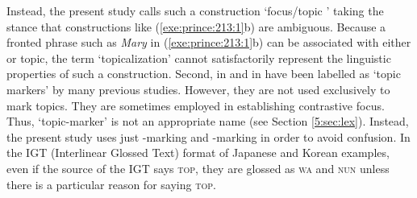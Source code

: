 \noindent Instead, the present study calls such a construction
`focus/topic ' taking the stance that constructions like
(\ref{exe:prince:213:1}b) are ambiguous. Because a fronted phrase such
as \textit{Mary} in (\ref{exe:prince:213:1}b) can be associated with
either  or topic, the term `topicalization' cannot
satisfactorily represent the linguistic properties of such a
construction.  Second, \wa in  and \nun in 
have been labelled as `topic markers' by many previous
studies. However, they are not used exclusively to mark topics. They
are sometimes employed in establishing contrastive
focus. Thus, `topic-marker' is not an
appropriate name (see Section \ref{5:sec:lex}).  Instead, the present study
uses just \wa-marking and \onun-marking in order to avoid
confusion. In the IGT (Interlinear Glossed Text) format of Japanese
and Korean examples, even if the source of the IGT says \textsc{top},
they are glossed as \textsc{wa} and \textsc{nun} unless there is a
particular reason for saying \textsc{top}.


